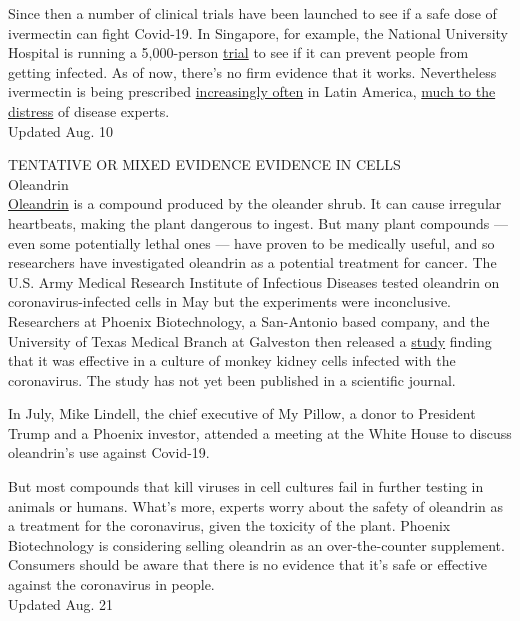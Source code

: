 Since then a number of clinical trials have been launched to see if a
safe dose of ivermectin can fight Covid-19. In Singapore, for example,
the National University Hospital is running a 5,000-person
\href{https://clinicaltrials.gov/ct2/show/NCT04446104}{trial} to see if
it can prevent people from getting infected. As of now, there's no firm
evidence that it works. Nevertheless ivermectin is being prescribed
\href{https://www.nytimes3xbfgragh.onion/2020/07/23/world/americas/chlorine-coronavirus-bolivia-latin-america.html?searchResultPosition=1}{increasingly
often} in Latin America,
\href{http://www.ajtmh.org/content/journals/10.4269/ajtmh.20-0271}{much
to the distress} of disease experts.\\
Updated Aug. 10

TENTATIVE OR MIXED EVIDENCE EVIDENCE IN CELLS\\
Oleandrin\\
\href{https://www.nytimes3xbfgragh.onion/2020/08/20/health/covid-oleandrin-trump-mypillow.html}{Oleandrin}
is a compound produced by the oleander shrub. It can cause irregular
heartbeats, making the plant dangerous to ingest. But many plant
compounds --- even some potentially lethal ones --- have proven to be
medically useful, and so researchers have investigated oleandrin as a
potential treatment for cancer. The U.S. Army Medical Research Institute
of Infectious Diseases tested oleandrin on coronavirus-infected cells in
May but the experiments were inconclusive. Researchers at Phoenix
Biotechnology, a San-Antonio based company, and the University of Texas
Medical Branch at Galveston then released a
\href{https://www.biorxiv.org/content/10.1101/2020.07.15.203489v1.abstract}{study}
finding that it was effective in a culture of monkey kidney cells
infected with the coronavirus. The study has not yet been published in a
scientific journal.

In July, Mike Lindell, the chief executive of My Pillow, a donor to
President Trump and a Phoenix investor, attended a meeting at the White
House to discuss oleandrin's use against Covid-19.

But most compounds that kill viruses in cell cultures fail in further
testing in animals or humans. What's more, experts worry about the
safety of oleandrin as a treatment for the coronavirus, given the
toxicity of the plant. Phoenix Biotechnology is considering selling
oleandrin as an over-the-counter supplement. Consumers should be aware
that there is no evidence that it's safe or effective against the
coronavirus in people.\\
Updated Aug. 21

